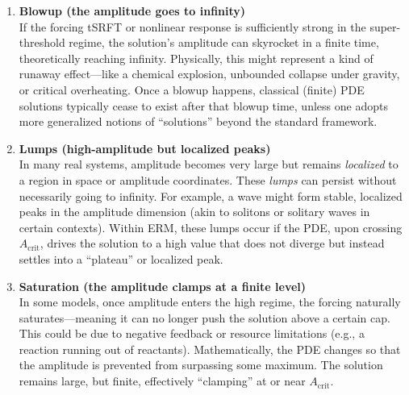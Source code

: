 \documentclass[12pt]{article}
\begin{document}
\begin{enumerate}
    \item \textbf{Blowup (the amplitude goes to infinity)} \\
    If the forcing tSRFT or nonlinear response is sufficiently strong in the
    super-threshold regime, the solution’s amplitude can skyrocket in a
    finite time, theoretically reaching infinity. Physically, this might
    represent a kind of runaway effect—like a chemical explosion, unbounded
    collapse under gravity, or critical overheating. Once a blowup happens,
    classical (finite) PDE solutions typically cease to exist after that
    blowup time, unless one adopts more generalized notions of “solutions”
    beyond the standard framework.

    \item \textbf{Lumps (high-amplitude but localized peaks)} \\
    In many real systems, amplitude becomes very large but remains
    \emph{localized} to a region in space or amplitude coordinates. These
    \emph{lumps} can persist without necessarily going to infinity. For
    example, a wave might form stable, localized peaks in the amplitude
    dimension (akin to solitons or solitary waves in certain contexts). 
    Within ERM, these lumps occur if the PDE, upon crossing $A_{\mathrm{crit}}$,
    drives the solution to a high value that does not diverge but instead
    settles into a “plateau” or localized peak.

    \item \textbf{Saturation (the amplitude clamps at a finite level)} \\
    In some models, once amplitude enters the high regime, the forcing
    naturally saturates—meaning it can no longer push the solution above
    a certain cap. This could be due to negative feedback or resource
    limitations (e.g., a reaction running out of reactants). Mathematically,
    the PDE changes so that the amplitude is prevented from surpassing
    some maximum. The solution remains large, but finite, effectively
    “clamping” at or near $A_{\mathrm{crit}}$.
\end{enumerate}

\medskip
\end{document}
